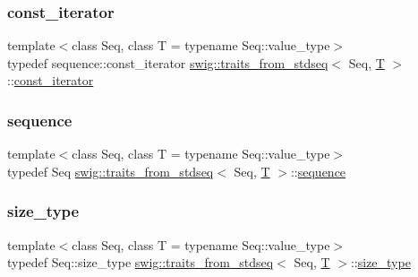 \subsubsection{\texorpdfstring{const\+\_\+iterator}{const\_iterator}}
{\footnotesize\ttfamily template$<$class Seq, class T = typename Seq\+::value\+\_\+type$>$ \\
typedef sequence\+::const\+\_\+iterator \hyperlink{structswig_1_1traits__from__stdseq}{swig\+::traits\+\_\+from\+\_\+stdseq}$<$ Seq, \hyperlink{fmt_8h_a0acb682b8260ab1c60b918599864e2e5}{T} $>$\+::\hyperlink{structswig_1_1traits__from__stdseq_ab1c085e18d48f5f0afe549b4dc885290}{const\+\_\+iterator}}

\mbox{\label{structswig_1_1traits__from__stdseq_ad784f89c80055794b0da097a644ab7ab}} 
\subsubsection{\texorpdfstring{sequence}{sequence}}
{\footnotesize\ttfamily template$<$class Seq, class T = typename Seq\+::value\+\_\+type$>$ \\
typedef Seq \hyperlink{structswig_1_1traits__from__stdseq}{swig\+::traits\+\_\+from\+\_\+stdseq}$<$ Seq, \hyperlink{fmt_8h_a0acb682b8260ab1c60b918599864e2e5}{T} $>$\+::\hyperlink{structswig_1_1traits__from__stdseq_ad784f89c80055794b0da097a644ab7ab}{sequence}}

\mbox{\label{structswig_1_1traits__from__stdseq_a1189d4a7cea9e522a7c10ed7ff2ce232}} 
\subsubsection{\texorpdfstring{size\+\_\+type}{size\_type}}
{\footnotesize\ttfamily template$<$class Seq, class T = typename Seq\+::value\+\_\+type$>$ \\
typedef Seq\+::size\+\_\+type \hyperlink{structswig_1_1traits__from__stdseq}{swig\+::traits\+\_\+from\+\_\+stdseq}$<$ Seq, \hyperlink{fmt_8h_a0acb682b8260ab1c60b918599864e2e5}{T} $>$\+::\hyperlink{structswig_1_1traits__from__stdseq_a1189d4a7cea9e522a7c10ed7ff2ce232}{size\+\_\+type}}

